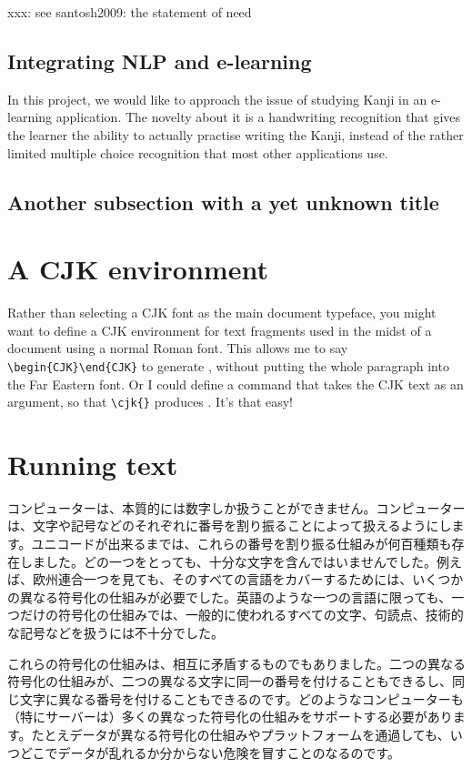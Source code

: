 xxx: see santosh2009: the statement of need

\subsection{Integrating NLP and e-learning}
In this project, we would like to approach the issue of studying Kanji in an e-learning application. The novelty about it is a handwriting recognition that gives the learner the ability to actually practise writing the Kanji, instead of the rather limited multiple choice recognition that most other applications use.


\subsection{Another subsection with a yet unknown title}

\section{A CJK environment}

Rather than selecting a CJK font as the main document typeface, you might want to define a CJK environment for text fragments used in the midst of a document using a normal Roman font. This allows me to say 
\verb|\begin{CJK}|\verb|\end{CJK}| to generate , without putting the whole paragraph into the Far Eastern font. Or I could define a command that takes the CJK text as an argument, so that \verb|\cjk{|\verb|}| produces . It's that easy!

\section{Running text}

\begin{CJK}
コンピューターは、本質的には数字しか扱うことができません。コンピューターは、文字や記号などのそれぞれに番号を割り振ることによって扱えるようにします。ユニコードが出来るまでは、これらの番号を割り振る仕組みが何百種類も存在しました。どの一つをとっても、十分な文字を含んではいませんでした。例えば、欧州連合一つを見ても、そのすべての言語をカバーするためには、いくつかの異なる符号化の仕組みが必要でした。英語のような一つの言語に限っても、一つだけの符号化の仕組みでは、一般的に使われるすべての文字、句読点、技術的な記号などを扱うには不十分でした。


これらの符号化の仕組みは、相互に矛盾するものでもありました。二つの異なる符号化の仕組みが、二つの異なる文字に同一の番号を付けることもできるし、同じ文字に異なる番号を付けることもできるのです。どのようなコンピューターも（特にサーバーは）多くの異なった符号化の仕組みをサポートする必要があります。たとえデータが異なる符号化の仕組みやプラットフォームを通過しても、いつどこでデータが乱れるか分からない危険を冒すことのなるのです。

\end{CJK}